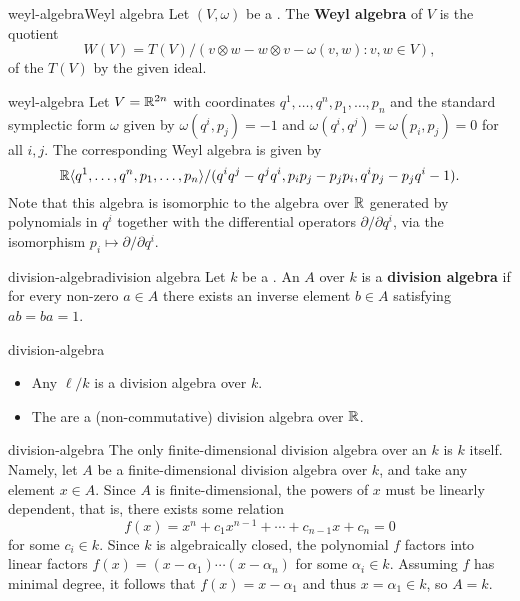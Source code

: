 \begin{topic}{weyl-algebra}{Weyl algebra}
    Let $(V, \omega)$ be a . The \textbf{Weyl algebra} of $V$ is the quotient
    \[ W(V) = T(V) / (v \otimes w - w \otimes v - \omega(v, w) : v, w \in V) , \]
    of the  $T(V)$ by the given ideal.
\end{topic}

\begin{example}{weyl-algebra}
    Let $V = \mathbb{R}^{2n}$ with coordinates $q^1, \ldots, q^n, p_1, \ldots, p_n$ and the standard symplectic form $\omega$ given by $\omega(q^i, p_j) = -1$ and $\omega(q^i, q^j) = \omega(p_i, p_j) = 0$ for all $i, j$. The corresponding Weyl algebra is given by
    \[ \mathbb{R} \langle q^1, \ldots, q^n, p_1, \ldots, p_n \rangle / (q^i q^j - q^j q^i, p_i p_j - p_j p_i, q^i p_j - p_j q^i - 1) . \]
    Note that this algebra is isomorphic to the algebra over $\mathbb{R}$ generated by polynomials in $q^i$ together with the differential operators $\partial/\partial q^i$, via the isomorphism $p_i \mapsto \partial/\partial q^i$.
\end{example}

\begin{topic}{division-algebra}{division algebra}
    Let $k$ be a . An  $A$ over $k$ is a \textbf{division algebra} if for every non-zero $a \in A$ there exists an inverse element $b \in A$ satisfying $ab = ba = 1$.
\end{topic}

\begin{example}{division-algebra}
    \begin{itemize}
        \item Any  $\ell / k$ is a division algebra over $k$.
        \item The  are a (non-commutative) division algebra over $\mathbb{R}$.
    \end{itemize}
\end{example}

\begin{example}{division-algebra}
    The only finite-dimensional division algebra over an  $k$ is $k$ itself. Namely, let $A$ be a finite-dimensional division algebra over $k$, and take any element $x \in A$. Since $A$ is finite-dimensional, the powers of $x$ must be linearly dependent, that is, there exists some relation
    \[ f(x) = x^n + c_1 x^{n - 1} + \cdots + c_{n - 1} x + c_n = 0 \]
    for some $c_i \in k$. Since $k$ is algebraically closed, the polynomial $f$ factors into linear factors $f(x) = (x - \alpha_1) \cdots (x - \alpha_n)$ for some $\alpha_i \in k$. Assuming $f$ has minimal degree, it follows that $f(x) = x - \alpha_1$ and thus $x = \alpha_1 \in k$, so $A = k$.
\end{example}

